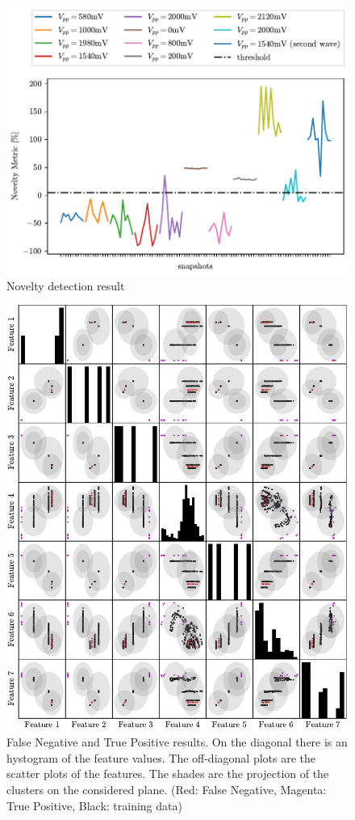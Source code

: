 \begin{figure}
    \centering
    \includegraphics{Images/shaker/Test02.pdf}
    \caption{Novelty detection result}
    \label{fig:shaker_results02}
\end{figure}

\begin{figure}
    \centering
    \includegraphics{Images/shaker/ConfusionMatrix.pdf}
    \caption{False Negative and True Positive results. On the diagonal there is an hystogram of the feature values. The off-diagonal plots are the scatter plots of the features. The shades are the projection of the clusters on the considered plane. (Red: False Negative, Magenta: True Positive, Black: training data)}
    \label{fig:shaker_conf_matrix}
    \end{figure}